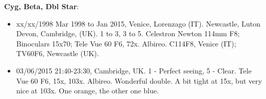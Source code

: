{\bf Cyg, Beta, Dbl Star}:
\begin{itemize}
\item xx/xx/1998 Mar 1998 to Jan 2015, Venice, Lorenzago (IT). Newcastle, Luton Devon, Cambridge, (UK). 1 to 3, 3 to 5. Celestron Newton 114mm F8; Binoculars 15x70; Tele Vue 60 F6, 72x. Albireo. C114F8, Venice (IT); TV60F6, Newcastle (UK).
\item 03/06/2015 21:40-23:30, Cambridge, UK. 1 - Perfect seeing, 5 - Clear. Tele Vue 60 F6, 15x, 103x. Albireo. Wonderful double. A bit tight at 15x, but very nice at 103x. One orange, the other one blue.
\end{itemize}
